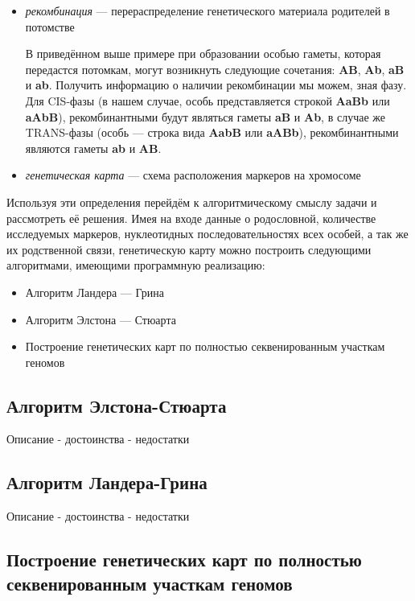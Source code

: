 \documentclass{matmex-diploma-custom}
\begin{document}
\begin{itemize}
\item \emph{рекомбинация} --- перераспределение генетического материала
  родителей в потомстве

  В приведённом выше примере при образовании особью гаметы, которая
  передастся потомкам, могут возникнуть следующие сочетания:
  \textbf{AB}, \textbf{Ab}, \textbf{aB} и \textbf{ab}. Получить
  информацию о наличии рекомбинации мы можем, зная фазу. Для CIS-фазы
  (в нашем случае, особь представляется строкой \textbf{AaBb} или
  \textbf{aAbB}), рекомбинантными будут являться гаметы \textbf{aB} и
  \textbf{Ab}, в случае же TRANS-фазы (особь --- строка вида
  \textbf{AabB} или \textbf{aABb}), рекомбинантными являются гаметы
  \textbf{ab} и \textbf{AB}.

\item \emph{генетическая карта} --- схема расположения маркеров на хромосоме

\end{itemize}

Используя эти определения перейдём к алгоритмическому
смыслу задачи и рассмотреть её решения. Имея на входе данные о
родословной, количестве исследуемых маркеров, нуклеотидных
последовательностях всех особей, а так же их родственной
связи, генетическую карту можно построить следующими алгоритмами,
имеющими программную реализацию:
\begin{itemize}
\item Алгоритм Ландера --- Грина \cite{lander}
\item Алгоритм Элстона --- Стюарта \cite{stewart}
\item Построение генетических карт по полностью секвенированным
  участкам геномов \cite{sysoev}
\end{itemize}

\subsection{Алгоритм Элстона-Стюарта}

Описание - достоинства - недостатки

\subsection{Алгоритм Ландера-Грина}

Описание - достоинства - недостатки

\subsection{Построение генетических карт по полностью секвенированным
участкам геномов}
\end{document}

